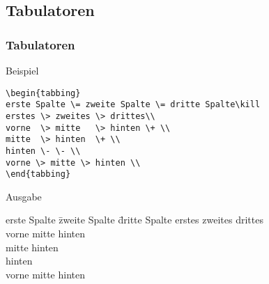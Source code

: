 \subsection{Tabulatoren}

\begin{frame}[c,fragile]
\frametitle{Tabulatoren}

\begin{block}{Beispiel}
\begin{verbatim}
\begin{tabbing}
erste Spalte \= zweite Spalte \= dritte Spalte\kill
erstes \> zweites \> drittes\\
vorne  \> mitte   \> hinten \+ \\
mitte  \> hinten  \+ \\
hinten \- \- \\
vorne \> mitte \> hinten \\
\end{tabbing}
\end{verbatim}
\end{block}

\begin{block}{Ausgabe}
\begin{tabbing}
erste Spalte \= zweite Spalte \= dritte Spalte\kill
erstes \> zweites \> drittes\\
vorne  \> mitte   \> hinten \+ \\
mitte  \> hinten  \+ \\
hinten \- \- \\
vorne \> mitte \> hinten \\
\end{tabbing}
\end{block}

\end{frame}

